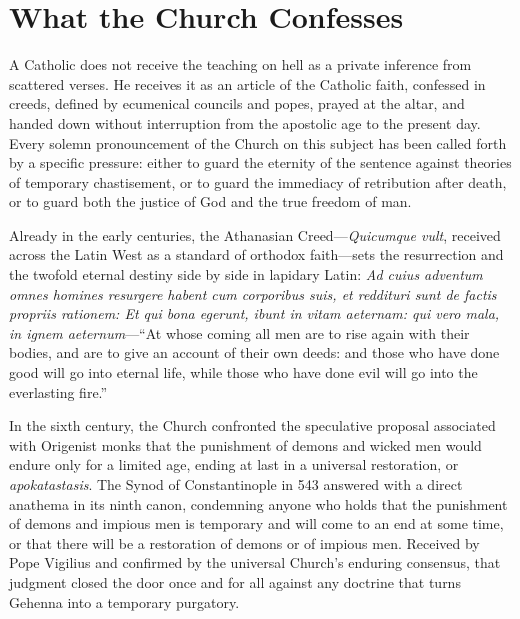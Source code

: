 \section{What the Church Confesses}

A Catholic does not receive the teaching on hell as a private inference from scattered verses. He receives it as an article of the Catholic faith, confessed in creeds, defined by ecumenical councils and popes, prayed at the altar, and handed down without interruption from the apostolic age to the present day. Every solemn pronouncement of the Church on this subject has been called forth by a specific pressure: either to guard the eternity of the sentence against theories of temporary chastisement, or to guard the immediacy of retribution after death, or to guard both the justice of God and the true freedom of man.

Already in the early centuries, the Athanasian Creed---\textit{Quicumque vult}, received across the Latin West as a standard of orthodox faith---sets the resurrection and the twofold eternal destiny side by side in lapidary Latin: \textit{Ad cuius adventum omnes homines resurgere habent cum corporibus suis, et reddituri sunt de factis propriis rationem: Et qui bona egerunt, ibunt in vitam aeternam: qui vero mala, in ignem aeternum}---``At whose coming all men are to rise again with their bodies, and are to give an account of their own deeds: and those who have done good will go into eternal life, while those who have done evil will go into the everlasting fire.''

In the sixth century, the Church confronted the speculative proposal associated with Origenist monks that the punishment of demons and wicked men would endure only for a limited age, ending at last in a universal restoration, or \textit{apokatastasis}. The Synod of Constantinople in 543 answered with a direct anathema in its ninth canon, condemning anyone who holds that the punishment of demons and impious men is temporary and will come to an end at some time, or that there will be a restoration of demons or of impious men. Received by Pope Vigilius and confirmed by the universal Church's enduring consensus, that judgment closed the door once and for all against any doctrine that turns Gehenna into a temporary purgatory.

